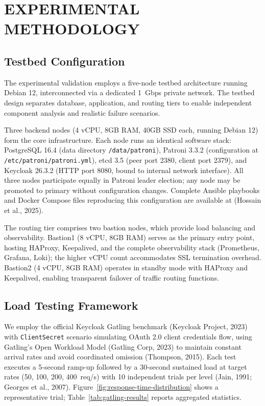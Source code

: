\documentclass[a4paper,twoside]{article}
\begin{document}
\section{\uppercase{Experimental Methodology}}
\label{sec:methodology}

\subsection{Testbed Configuration}

The experimental validation employs a five-node testbed architecture running Debian 12, interconnected via a dedicated 1~Gbps private network. The testbed design separates database, application, and routing tiers to enable independent component analysis and realistic failure scenarios.

Three backend nodes (4 vCPU, 8GB RAM, 40GB SSD each, running Debian 12) form the core infrastructure. Each node runs an identical software stack: PostgreSQL 16.4 (data directory \texttt{/data/patroni}), Patroni 3.3.2 (configuration at \texttt{/etc/patroni/patroni.yml}), etcd 3.5 (peer port 2380, client port 2379), and Keycloak 26.3.2 (HTTP port 8080, bound to internal network interface). All three nodes participate equally in Patroni leader election; any node may be promoted to primary without configuration changes. Complete Ansible playbooks and Docker Compose files reproducing this configuration are available at (Hossain et al., 2025).

The routing tier comprises two bastion nodes, which provide load balancing and observability. Bastion1 (8 vCPU, 8GB RAM) serves as the primary entry point, hosting HAProxy, Keepalived, and the complete observability stack (Prometheus, Grafana, Loki); the higher vCPU count accommodates SSL termination overhead. Bastion2 (4 vCPU, 8GB RAM) operates in standby mode with HAProxy and Keepalived, enabling transparent failover of traffic routing functions.

\subsection{Load Testing Framework}

We employ the official Keycloak Gatling benchmark (Keycloak Project, 2023) with \texttt{ClientSecret} scenario simulating OAuth 2.0 client credentials flow, using Gatling's Open Workload Model (Gatling Corp, 2023) to maintain constant arrival rates and avoid coordinated omission (Thompson, 2015). Each test executes a 5-second ramp-up followed by a 30-second sustained load at target rates (50, 100, 200, 400~req/s) with 10 independent trials per level (Jain, 1991; Georges et al., 2007). Figure~\ref{fig:response-time-distribution} shows a representative trial; Table~\ref{tab:gatling-results} reports aggregated statistics.
\end{document}
